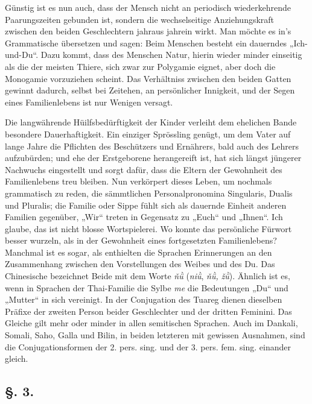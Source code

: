 Günstig ist es nun auch, dass der Mensch nicht an periodisch wiederkehrende Paarungszeiten gebunden ist, sondern die wechselseitige Anziehungskraft zwischen den beiden Geschlechtern jahraus jahrein wirkt. Man möchte es in’s Grammatische übersetzen und sagen: Beim Menschen besteht ein dauerndes „Ich-und-Du“. Dazu kommt, dass des Menschen Natur, hierin wieder minder einseitig als die der meisten Thiere, sich zwar zur Polygamie eignet, aber doch die Monogamie vorzuziehen scheint. Das Verhältniss zwischen den beiden Gatten gewinnt dadurch, selbst bei Zeitehen, an persönlicher Innigkeit, und der Segen eines Familienlebens ist nur Wenigen versagt.

Die langwährende Hüilfsbedürftigkeit der Kinder verleiht dem ehelichen Bande besondere Dauerhaftigkeit. Ein einziger Sprössling genügt, um dem Vater auf lange Jahre die Pflichten des Beschützers und Ernährers, bald auch des Lehrers aufzubürden; und ehe der Erstgeborene \label{fp.297} herangereift ist, hat sich längst jüngerer Nachwuchs eingestellt und sorgt dafür, dass die Eltern der Gewohnheit des Familienlebens treu bleiben. Nun verkörpert dieses Leben, um nochmals grammatisch zu reden, die sämmtlichen Personalpronomina Singularis, Dualis und Pluralis; die Familie oder Sippe fühlt sich als dauernde Einheit anderen Familien gegenüber, „Wir“ treten in Gegensatz zu „Euch“ und „Ihnen“. Ich glaube, das ist nicht blosse Wortspielerei. Wo konnte das persönliche Fürwort besser wurzeln, als in der Gewohnheit eines fortgesetzten Familienlebens? Manchmal ist es sogar, als enthielten die Sprachen Erinnerungen an den Zusammenhang zwischen den Vorstellungen des Weibes und des Du. Das Chinesische bezeichnet Beide mit dem Worte \textit{ň\`{ü}} (\textit{ni\`{ü}}, \textit{ň\`{ü},} \textit{ž\`{ü}}). Ähnlich ist es, wenn in Sprachen der Thai-Familie die Sylbe \textit{me} die Bedeutungen „Du“ und „Mutter“ in sich vereinigt. In der Conjugation des Tuareg dienen dieselben Präfixe der zweiten Person beider Geschlechter und der dritten Feminini. Das Gleiche gilt \label{sp.307} mehr oder minder in allen semitischen Sprachen. Auch im Dankali, Somali, Saho, Galla und Bilin, in beiden letzteren mit gewissen Ausnahmen, sind die Conjugationsformen der 2. pers. sing. und der 3. pers. fem. sing. einander gleich.

\subsection*{§. 3.}\label{IV.II.3}
